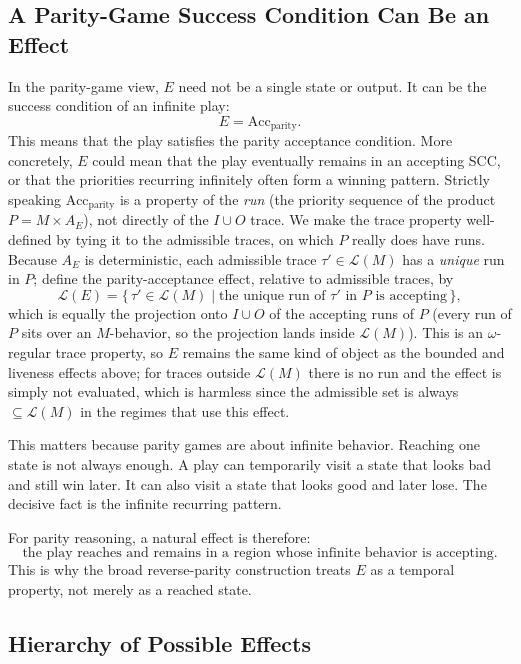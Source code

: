\documentclass[11pt]{article}
\theoremstyle{remark}
\newcommand{\Lang}{\mathcal{L}}
\begin{document}
\subsection{A Parity-Game Success Condition Can Be an Effect}

In the parity-game view, \(E\) need not be a single state or output. It can be
the success condition of an infinite play:
\[
  E = \mathrm{Acc}_{\mathrm{parity}}.
\]
This means that the play satisfies the parity acceptance condition. More
concretely, \(E\) could mean that the play eventually remains in an accepting
SCC, or that the priorities recurring infinitely often form a winning pattern.
Strictly speaking \(\mathrm{Acc}_{\mathrm{parity}}\) is a property of the
\emph{run} (the priority sequence of the product \(P=M\times A_E\)), not directly
of the \(I\cup O\) trace. We make the trace property well-defined by tying it to
the admissible traces, on which \(P\) really does have runs. Because \(A_E\) is
deterministic, each admissible trace \(\tau'\in\Lang(M)\) has a \emph{unique} run
in \(P\); define the parity-acceptance effect, relative to admissible traces, by
\[
  \Lang(E)=\{\,\tau'\in\Lang(M)\mid \text{the unique run of } \tau' \text{ in } P
  \text{ is accepting}\,\},
\]
which is equally the projection onto \(I\cup O\) of the accepting runs of \(P\)
(every run of \(P\) sits over an \(M\)-behavior, so the projection lands inside
\(\Lang(M)\)). This is an \(\omega\)-regular trace property, so \(E\) remains the
same kind of object as the bounded and liveness effects above; for traces outside
\(\Lang(M)\) there is no run and the effect is simply not evaluated, which is
harmless since the admissible set is always \(\subseteq\Lang(M)\) in the
regimes that use this effect.

This matters because parity games are about infinite behavior. Reaching one
state is not always enough. A play can temporarily visit a state that looks bad
and still win later. It can also visit a state that looks good and later lose.
The decisive fact is the infinite recurring pattern.

For parity reasoning, a natural effect is therefore:
\[
  \text{the play reaches and remains in a region whose infinite behavior is
  accepting.}
\]
This is why the broad reverse-parity construction treats \(E\) as a temporal
property, not merely as a reached state.

\subsection{Hierarchy of Possible Effects}
\end{document}
